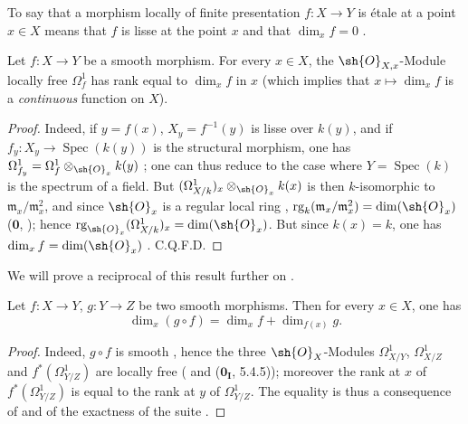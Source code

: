 To say that a morphism locally of finite presentation $f:X\to Y$ is \'etale at a point $x\in X$ means that $f$ is lisse at the point $x$ and that $\dim_x f=0$ .

\begin{proposition}[17.10.2]
\label{IV.17.10.2}
Let $f:X\to Y$ be a smooth morphism.
For every $x\in X$, the $\sh{O}_{X,x}$-Module locally free $\Omega^1_f$  has rank equal to $\dim_x f$ in $x$ (which implies that $x\mapsto\dim_x f$ is a \emph{continuous} function on $X$).
\end{proposition}

\begin{proof}
Indeed, if $y=f(x)$, $X_y=f^{-1}(y)$ is lisse over $k(y)$, and if $f_y:X_y\to\operatorname{Spec}(k(y))$ is the structural morphism, one has $\Omega^1_{f_y}=\Omega^1_f\otimes_{\sh{O}_x} k(y)$ ; one can thus reduce to the case where $Y=\operatorname{Spec}(k)$ is the spectrum of a field.
But  $(\Omega^1_{X/k})_x\otimes_{\sh{O}_x} k(x)$ is then $k$-isomorphic to $\mathfrak{m}_x/\mathfrak{m}_x^2$, and since $\sh{O}_x$ is a regular local ring , $\operatorname{rg}_k(\mathfrak{m}_x/\mathfrak{m}_x^2)=\dim(\sh{O}_x)$ ($\mathbf{0}$, ); hence $\operatorname{rg}_{\sh{O}_x}(\Omega^1_{X/k})_x=\dim(\sh{O}_x)$.
But since $k(x)=k$, one has $\dim_x f=\dim(\sh{O}_x)$ .
C.Q.F.D.
\end{proof}

We will prove a reciprocal of this result further on .


\begin{corollary}[17.10.3]
\label{IV.17.10.3}
Let $f:X\to Y$, $g:Y\to Z$ be two smooth morphisms.
Then for every $x\in X$, one has
\[
\dim_x(g\circ f) = \dim_x f + \dim_{f(x)} g.
\]
\end{corollary}

\begin{proof}
Indeed, $g\circ f$ is smooth , hence the three $\sh{O}_X$-Modules $\Omega^1_{X/Y}$, $\Omega^1_{X/Z}$ and $f^*(\Omega^1_{Y/Z})$ are locally free ( and ($\mathbf{0_I}$, 5.4.5)); moreover the rank at $x$ of $f^*(\Omega^1_{Y/Z})$ is equal to the rank at $y$ of $\Omega^1_{Y/Z}$.
The equality  is thus a consequence of  and of the exactness of the suite .
\end{proof}

